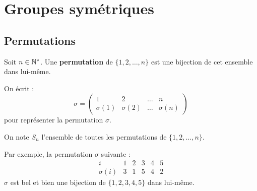 \documentclass[11pt,a4paper]{report}
\begin{document}
\MakeSwissCover

\tableofcontents

\chapter{Groupes symétriques}

\section{Permutations}

\begin{definition}
    Soit $n \in \mathbb{N}^*$. Une \textbf{permutation} de $\{1, 2, \dots, n\}$ est une bijection de cet ensemble dans lui-même.

    On écrit :
    $$\sigma = \left(\begin{matrix} 1 & 2 & \dots & n \\ \sigma(1) & \sigma(2) & \dots & \sigma(n) \end{matrix}\right)$$
    pour représenter la permutation $\sigma$.

    On note $S_n$ l'ensemble de toutes les permutations de $\{1, 2, \dots, n\}$.
\end{definition}

\begin{example}[Permutation]
    Par exemple, la permutation $\sigma$ suivante :
    \[
        \begin{array}{c|ccccc}
            i & 1 & 2 & 3 & 4 & 5 \\
            \hline
            \sigma(i) & 3 & 1 & 5 & 4 & 2
        \end{array}
    \]
    $\sigma$ est bel et bien une bijection de $\{1, 2, 3, 4, 5\}$ dans lui-même.
\end{example}
\end{document}
